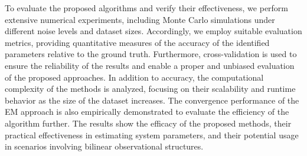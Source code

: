 %
To evaluate the proposed algorithms and verify their effectiveness, we perform extensive numerical experiments, including Monte Carlo simulations under different noise levels and dataset sizes. Accordingly, we employ suitable evaluation metrics, providing quantitative measures of the accuracy of the identified parameters relative to the ground truth. Furthermore, cross-validation is used to ensure the reliability of the results and enable a proper and unbiased evaluation of the proposed approaches. In addition to accuracy, the computational complexity of the methods is analyzed, focusing on their scalability and runtime behavior as the size of the dataset increases. The convergence performance of the EM approach is also empirically demonstrated to evaluate the efficiency of the algorithm further. The results show the efficacy of the proposed methods, their practical effectiveness in estimating system parameters, and their potential usage in scenarios involving bilinear observational structures. 
%

